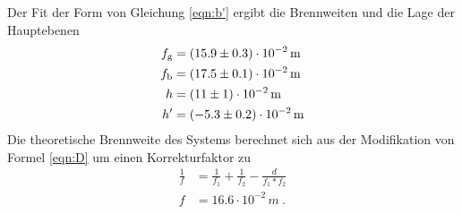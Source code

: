 Der Fit der Form von Gleichung \eqref{eqn:b'} ergibt die Brennweiten und die Lage der Hauptebenen
\begin{eqnarray}
  f_\text{g} &= (\num{ 15.9 +- 0.3}) \cdot 10^{-2} \, \text{m} \\
  f_\text{b} &= (\num{ 17.5 +- 0.1 }) \cdot 10^{-2} \, \text{m} \\
  h &= (\num{ 11 +- 1}) \cdot 10^{-2} \, \text{m} \\
  h' &= (\num{ -5.3 +- 0.2}) \cdot 10^{-2} \,\text{m}
  \label{eqn:abbedf}
\end{eqnarray}
Die theoretische Brennweite des Systems berechnet sich aus der Modifikation von Formel \eqref{eqn:D} um einen Korrekturfaktor zu
\begin{eqnarray}
  \frac{1}{f} &= \frac{1}{f_1} + \frac{1}{f_2} - \frac{d}{f_1 * f_2} \\
  f &= 16.6 \cdot 10^{-2} \, m \ .
  \label{tabbe}
\end{eqnarray}
